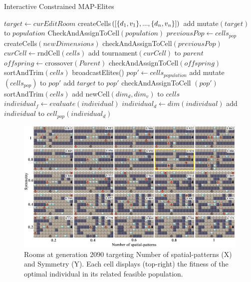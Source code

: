 \begin{algorithm}
\footnotesize
\caption{Interactive Constrained MAP-Elites}\label{alg:IC-MAPE}
\begin{algorithmic}[1]
\State $target \gets curEditRoom$ 
\State createCells$(\protect[\{d_1,v_1\},...,\{d_n,v_n\}])$
     \State add mutate$(target)$ to $population$
\EndFor
\State CheckAndAssignToCell$(population)$ 
 
            \State $previousPop \gets cells_{pop}$
            \State createCells$(newDimensions)$
            \State checkAndAssignToCell$(previousPop)$ 
        \EndIf
                \State $curCell \gets \text{rndCell}(cells)$
                \State add tournament$(curCell)$ to $parent$
            \EndFor
            \State $offspring \gets  \text{crossover}(Parent)$
            \State checkAndAssignToCell$(offspring)$
        \EndRepeat
        \State sortAndTrim$(cells)$
    \EndFor
    \State broadcastElites() 
    \State $pop' \gets cells_{population}$
    \State add mutate$(cells_{pop})$ to $pop'$
    \State add $target$ to $pop'$
    \State checkAndAssignToCell $(pop')$
    \State sortAndTrim$(cells)$
\EndWhile
\EndProcedure
{}
        \State add newCell$(dim_d, dim_v)$ to $cells$
    \EndFor
\EndProcedure
{}
        \State $individual_f \gets evaluate(individual)$ 
        \State $individual_d \gets dim(individual)$
        \State add $individual$ to $cell_{pop}(individual_d)$
    \EndFor
\EndProcedure
\end{algorithmic}
\end{algorithm}

\begin{figure}[t]
\centerline{\includegraphics[width=\textwidth]{figure4.png}}
\caption{Rooms at generation $2090$ targeting Number of spatial-patterns (X) and Symmetry (Y). Each cell displays (top-right) the fitness of the optimal individual in its related feasible population. }
\label{figs:patt_sym}
\end{figure}

